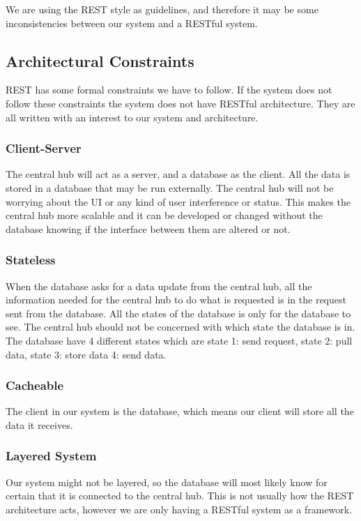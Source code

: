\documentclass[../document.tex]{subfiles}
\begin{document}
We are using the REST style as guidelines, and therefore it may be some inconsistencies between our system and a RESTful system. 

\subsection{Architectural Constraints}
REST has some formal constraints we have to follow. If the system does not follow these constraints the system does not have RESTful architecture. They are all written with an interest to our system and architecture.

\subsubsection{Client-Server}
The central hub will act as a server, and a database as the client. All the data is stored in a database that may be run externally. The central hub will not be worrying about the UI or any kind of user interference or status. This makes the central hub more scalable and it can be developed or changed without the database knowing if the interface between them are altered or not. 

\subsubsection{Stateless}
When the database asks for a data update from the central hub, all the information needed for the central hub to do what is requested is in the request sent from the database. All the states of the database is only for the database to see. The central hub should not be concerned with which state the database is in. The database have 4 different states which are state 1: send request, state 2: pull data, state 3: store data 4: send data.

\subsubsection{Cacheable}
The client in our system is the database, which means our client will store all the data it receives. 

\subsubsection{Layered System}
Our system might not be layered, so the database will most likely know for certain that it is connected to the central hub. This is not usually how the REST architecture acts, however we are only having a RESTful system as a framework. 
\end{document}
